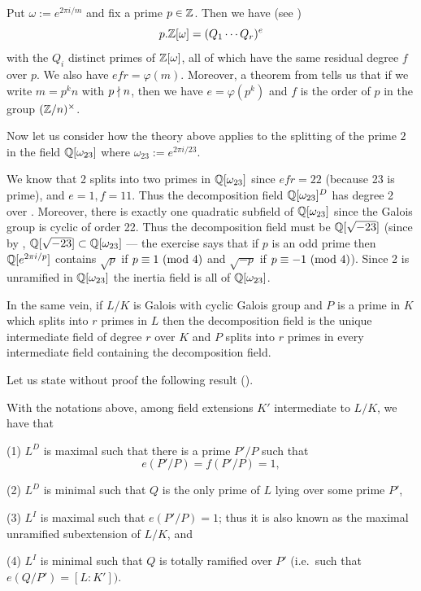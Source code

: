 \documentclass[10pt,a4paper]{amsart}
\begin{document}
Put $\omega := e^{2\pi i/m}$ and fix a prime $p\in\mathbb{Z}$. Then we have (see
\cite[p.~75]{M}) \[p.\mathbb{Z}[\omega] = (Q_1\cdots Q_r)^{e}\] with the $Q_i$ distinct
primes of $\mathbb{Z}[\omega]$, all of which have the same residual degree $f$ over
$p$. We also have $efr = \varphi(m).$ Moreover, a theorem from \cite[p.~76]{M}
tells us that if we write $m=p^k n$ with $p\nmid n$, then we have
$e=\varphi(p^k)$ and $f$ is the order of $p$ in the group $(\mathbb{Z}/n)^\times$.

Now let us consider how the theory above applies to the splitting of the prime
$2$ in the field $\mathbb{Q}[\omega_{23}]$ where $\omega_{23} := e^{2\pi i/23}.$

We know that 2 splits into two primes in $\mathbb{Q}[\omega_{23}]$ since $efr = 22$
(because 23 is prime), and $e=1,f=11$. Thus the decomposition field
$\mathbb{Q}[\omega_{23}]^D$ has degree 2 over \Q{}. Moreover, there is exactly one
quadratic subfield of $\mathbb{Q}[\omega_{23}]$ since the Galois group is cyclic of
order 22. Thus the decomposition field must be $\mathbb{Q}[\sqrt{-23}]$ (since by
\cite[Ch.~2, Ex.~8]{M}, $\mathbb{Q}[\sqrt{-23}] \subset \mathbb{Q}[\omega_{23}]$ --- the
exercise says that if $p$ is an odd prime then $\mathbb{Q}[e^{2\pi i/p}]$ contains
$\sqrt{p}$ if $p \equiv 1 \text{ } (\mathrm{mod}\text{ } 4)$ and $\sqrt{-p}$ if $p\equiv -1 \text{ } (\mathrm{mod}\text{ } 4)$).
Since 2 is unramified in $\mathbb{Q}[\omega_{23}]$ the inertia field is all of
$\mathbb{Q}[\omega_{23}]$.

In the same vein, if $L/K$ is Galois with cyclic Galois group and $P$ is a
prime in $K$ which splits into $r$ primes in $L$ then the decomposition field
is the unique intermediate field of degree $r$ over $K$ and $P$ splits into $r$
primes in every intermediate field containing the decomposition field.

Let us state without proof the following result (\cite[Theorem 29,p.~104]{M}).

\begin{thm}
With the notations above, among field extensions $K'$ intermediate to $L/K$, we
have that

(1) $L^D$ is maximal such that there is a prime $P'/P$ such that $$e(P'/P) =
f(P'/P) = 1,$$

(2) $L^D$ is minimal such that $Q$ is the only prime of $L$ lying over some
prime $P'$,

(3) $L^I$ is maximal such that $e(P'/P)=1$; thus it is also known as the
maximal unramified subextension of $L/K$, and

(4) $L^I$ is minimal such that $Q$ is totally ramified over $P'$ (i.e.~such
that $e(Q/P') = [L:K']).$
\end{thm}
\end{document}
